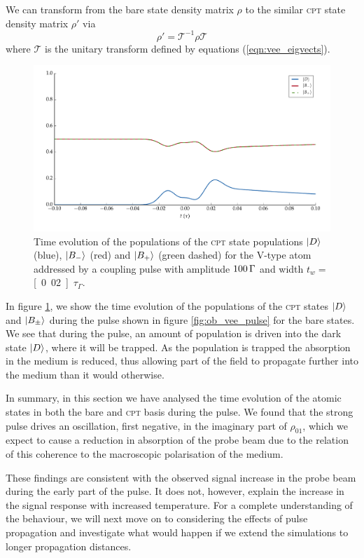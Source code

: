     We can transform from the bare state density matrix $\rho$ to the similar
    \textsc{cpt} state density matrix $\rho'$ via
    \begin{equation}
      \rho' = \mathcal{T}^{-1} \rho \mathcal{T}
      \label{eqn:rho01}
    \end{equation}
    where $\mathcal{T}$ is the unitary transform defined by equations
    (\ref{eqn:vee_eigvects}).

    \begin{figure}[]
    \includegraphics[width=\linewidth]{figs/06_simultons/ob_vee_solve_pls_t002_50c_100p_fig2.pdf}
    \caption{
    Time evolution of the populations of the \textsc{cpt} state populations
    $\Ket{D}$ (blue), $\Ket{B_-}$ (red) and $\Ket{B_+}$ (green dashed) for the
    V-type atom addressed by a coupling pulse with amplitude $\unit[100]\Gamma$
    and width $t_w = $ \unit[0.02]{$\tau_\Gamma$}.
    }
    \label{fig:wp_propagation} 
    \end{figure}

    In figure \ref{fig:wp_propagation}, we show the time evolution of the
    populations of the \textsc{cpt} states $\Ket{D}$ and $\Ket{B_\pm}$ during
    the pulse shown in figure \ref{fig:ob_vee_pulse} for the bare states. We see
    that during the pulse, an amount of population is driven into the dark state
    $\Ket{D}$, where it will be trapped. As the population is trapped the
    absorption in the medium is reduced, thus allowing part of the field to
    propagate further into the medium than it would otherwise.

    In summary, in this section we have analysed the time evolution of the
    atomic states in both the bare and \textsc{cpt} basis during the pulse. We
    found that the strong pulse drives an oscillation, first negative, in the
    imaginary part of $\rho_{01}$, which we expect to cause a reduction in
    absorption of the probe beam due to the relation of this coherence to the
    macroscopic polarisation of the medium.

    These findings are consistent with the observed signal increase in the probe
    beam during the early part of the pulse. It does not, however, explain the
    increase in the signal response with increased temperature. For a complete
    understanding of the behaviour, we will next move on to considering the
    effects of pulse propagation and investigate what would happen if we extend
    the simulations to longer propagation distances.

    


